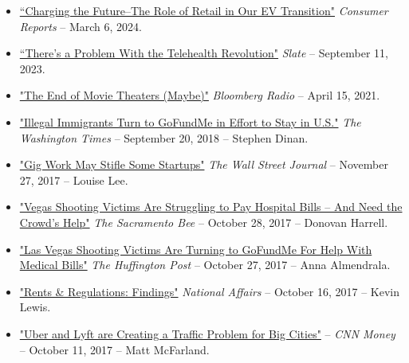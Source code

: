 \documentclass[10.5pt,letterpaper,sans]{moderncv}        %
\begin{document}
\begin{itemize}
\item \textcolor{gray}{\href{https://advocacy.consumerreports.org/research/cr-report-charging-the-future-the-role-of-retail-in-our-ev-transition/}{``Charging the Future--The Role of Retail in Our EV Transition"}} \textit{Consumer Reports} -- March 6, 2024.

\item \textcolor{gray}{\href{https://slate.com/technology/2023/09/telehealth-revolution-revenue-rural-hospitals-research.html}{``There's a Problem With the Telehealth Revolution"}} \textit{Slate} -- September 11, 2023.

\item \textcolor{gray}{\href{https://www.bloomberg.com/news/audio/2021-04-15/baystate-business-the-end-of-movie-theaters-maybe-radio}{"The End of Movie Theaters (Maybe)"}} \textit{Bloomberg Radio} -- April 15, 2021.

\item \textcolor{gray}{\href{https://www.washingtontimes.com/news/2018/sep/20/pro-trumpers-turn-gofundme-build-border-wall/}{"Illegal Immigrants Turn to GoFundMe in Effort to Stay in U.S."}} \textit{The Washington Times} -- September 20, 2018 -- Stephen Dinan.

\item \textcolor{gray}{\href{https://www.wsj.com/articles/gig-work-may-stifle-some-startups-1511751901}{"Gig Work May Stifle Some Startups"}}  \textit{The Wall Street Journal} 
-- November 27, 2017 -- Louise Lee.

\item \textcolor{gray}{\href{http://www.sacbee.com/news/nation-world/national/article181505276.html}{"Vegas Shooting Victims Are Struggling to Pay Hospital Bills -- And Need the Crowd's Help"}} \textit{The Sacramento Bee} -- October 28, 2017 -- Donovan Harrell.

\item \textcolor{gray}{\href{https://www.huffingtonpost.com/entry/vegas-shooting-victims-crowdfunding_us_59f3a51be4b07fdc5fbe465c}{"Las Vegas Shooting Victims Are Turning to GoFundMe For Help With Medical Bills"}} \textit{The Huffington Post} -- October 27, 2017 -- Anna Almendrala.

\item \textcolor{gray}{\href{https://nationalaffairs.com/blog/detail/findings-a-daily-roundup/rents-and-regulations}{"Rents \& Regulations: Findings"}} \textit{National Affairs} -- October 16, 2017 -- Kevin Lewis.

\item \textcolor{gray}{\href{https://money.cnn.com/2017/10/11/technology/future/ride-hailing-cities-public-transit/index.html?section=money_topstories}{"Uber and Lyft are Creating a Traffic Problem for Big Cities"}} -- \textit{CNN Money} -- October 11, 2017 -- Matt McFarland.


\end{itemize}
\end{document}

